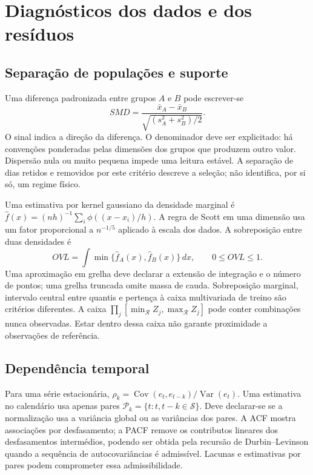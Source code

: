 
\section{Diagnósticos dos dados e dos resíduos}
\label{sec:mat-diagnosticos}

\subsection{Separação de populações e suporte}
\label{sec:mat-suporte}
Uma diferença padronizada entre grupos $A$ e $B$ pode escrever-se
\begin{equation}
SMD=\frac{\bar x_A-\bar x_B}{\sqrt{(s_A^2+s_B^2)/2}}.
\label{eq:mat-smd}
\end{equation}
O sinal indica a direção da diferença. O denominador deve ser explicitado: há convenções ponderadas pelas dimensões dos grupos que produzem outro valor. Dispersão nula ou muito pequena impede uma leitura estável. A separação de dias retidos e removidos por este critério descreve a seleção; não identifica, por si só, um regime físico.

Uma estimativa por kernel gaussiano da densidade marginal é $\widehat f(x)=(nh)^{-1}\sum_i\phi((x-x_i)/h)$. A regra de Scott em uma dimensão usa um fator proporcional a $n^{-1/5}$ aplicado à escala dos dados. A sobreposição entre duas densidades é
\begin{equation}
OVL=\int\min\{\widehat f_A(x),\widehat f_B(x)\}\,dx,
\qquad 0\leq OVL\leq1.
\label{eq:mat-overlap}
\end{equation}
Uma aproximação em grelha deve declarar a extensão de integração e o número de pontos; uma grelha truncada omite massa de cauda. Sobreposição marginal, intervalo central entre quantis e pertença à caixa multivariada de treino são critérios diferentes. A caixa $\prod_j[\min_{\mathcal R}Z_j,\max_{\mathcal R}Z_j]$ pode conter combinações nunca observadas. Estar dentro dessa caixa não garante proximidade a observações de referência.

\subsection{Dependência temporal}
\label{sec:mat-acf}
Para uma série estacionária, $\rho_k=\operatorname{Cov}(e_t,e_{t-k})/\operatorname{Var}(e_t)$. Uma estimativa no calendário usa apenas pares $\mathcal P_k=\{t:t,t-k\in\mathcal S\}$. Deve declarar-se se a normalização usa a variância global ou as variâncias dos pares. A ACF mostra associações por desfasamento; a PACF remove os contributos lineares dos desfasamentos intermédios, podendo ser obtida pela recursão de Durbin--Levinson quando a sequência de autocovariâncias é admissível. Lacunas e estimativas por pares podem comprometer essa admissibilidade.

